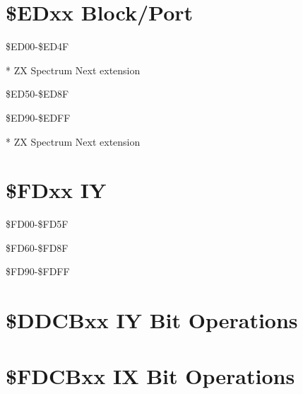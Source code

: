 \section{\$EDxx Block/Port}
\begin{table}[h]\centering\scriptsize
  \caption{\$ED00-\$ED4F}

  * ZX Spectrum Next extension
\end{table}
\begin{table}[h]\centering\scriptsize
  \caption{\$ED50-\$ED8F}
\end{table}
\begin{table}[h]\centering\scriptsize
  \caption{\$ED90-\$EDFF}

  * ZX Spectrum Next extension
\end{table}
\section{\$FDxx IY}
\begin{table}[h]\centering\scriptsize
  \caption{\$FD00-\$FD5F}
\end{table}
\begin{table}[h]\centering\scriptsize
  \caption{\$FD60-\$FD8F}
\end{table}
\begin{table}[h]\centering\scriptsize
  \caption{\$FD90-\$FDFF}
\end{table}
\section{\$DDCBxx IY Bit Operations}
\section{\$FDCBxx IX Bit Operations}

